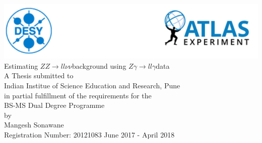 \documentclass[11pt,a4paper]{report}
\newcommand{\ZZ}{$ZZ\to ll\nu\nu$}
\newcommand{\Zg}{$Z\gamma\to ll\gamma$}
\begin{document}
\begin{titlepage}
\centering
\includegraphics[width=0.9\linewidth]{Title_Head.png}
\vspace{exit}
{\Huge Estimating \ZZ background using \Zg data\\\vspace{1cm}\large A Thesis}
{submitted to\\Indian Institue of Science Education and Research, Pune\\ in partial fulfillment of the requirements for the \\BS-MS Dual Degree Programme\vspace{1cm}\\by\vspace{1cm}\\Mangesh Sonawane\vspace{0.5cm}\\Registration Number: 20121083}
\vfill
{June 2017 - April 2018}
\end{titlepage}
\end{document}
